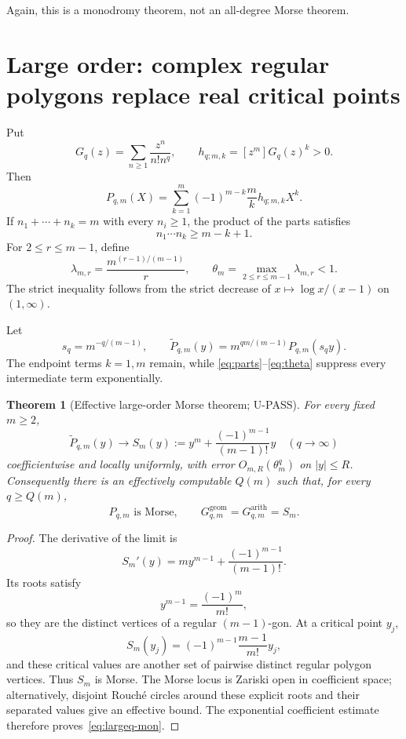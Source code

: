 \documentclass[11pt]{article}
\theoremstyle{keio}
\newtheorem{theorem}{Theorem}[section]
\theoremstyle{keioinput}
\newcommand{\UPASS}{\textcolor{passgreen}{\textsf{U-PASS}}}
\begin{document}
Again, this is a monodromy theorem, not an all-degree Morse theorem.

\section{Large order: complex regular polygons replace real critical points}

Put
\[
G_q(z)=\sum_{n\ge1}\frac{z^n}{n!n^q},
\qquad
h_{q;m,k}=[z^m]G_q(z)^k>0.
\]
Then
\begin{equation}
P_{q,m}(X)
=\sum_{k=1}^m(-1)^{m-k}\frac{m}{k}h_{q;m,k}X^k.
\label{eq:P-positive}
\end{equation}
If $n_1+\cdots+n_k=m$ with every $n_i\ge1$, the product of the parts
satisfies
\begin{equation}
n_1\cdots n_k\ge m-k+1.
\label{eq:parts}
\end{equation}
For $2\le r\le m-1$, define
\begin{equation}
\lambda_{m,r}=\frac{m^{(r-1)/(m-1)}}r,
\qquad
\theta_m=\max_{2\le r\le m-1}\lambda_{m,r}<1.
\label{eq:theta}
\end{equation}
The strict inequality follows from the strict decrease of
$x\mapsto\log x/(x-1)$ on $(1,\infty)$.

Let
\[
s_q=m^{-q/(m-1)},
\qquad
\widetilde P_{q,m}(y)
=m^{qm/(m-1)}P_{q,m}(s_qy).
\]
The endpoint terms $k=1,m$ remain, while
\eqref{eq:parts}--\eqref{eq:theta} suppress every intermediate term
exponentially.

\begin{theorem}[Effective large-order Morse theorem; \UPASS]\label{thm:largeq}
For every fixed $m\ge2$,
\begin{equation}
\boxed{
\widetilde P_{q,m}(y)
\longrightarrow
S_m(y):=y^m+\frac{(-1)^{m-1}}{(m-1)!}y
\quad(q\to\infty)}
\label{eq:limit}
\end{equation}
coefficientwise and locally uniformly, with error
$O_{m,R}(\theta_m^q)$ on $|y|\le R$. Consequently there is an effectively
computable $Q(m)$ such that, for every $q\ge Q(m)$,
\begin{equation}
\boxed{
P_{q,m}\text{ is Morse},
\qquad
G^{\mathrm{geom}}_{q,m}=G^{\mathrm{arith}}_{q,m}=S_m.}
\label{eq:largeq-mon}
\end{equation}
\end{theorem}

\begin{proof}
The derivative of the limit is
\[
S_m'(y)=my^{m-1}+\frac{(-1)^{m-1}}{(m-1)!}.
\]
Its roots satisfy
\[
y^{m-1}=\frac{(-1)^m}{m!},
\]
so they are the distinct vertices of a regular $(m-1)$-gon. At a critical
point $y_j$,
\[
S_m(y_j)=(-1)^{m-1}\frac{m-1}{m!}y_j,
\]
and these critical values are another set of pairwise distinct regular
polygon vertices. Thus $S_m$ is Morse. The Morse locus is Zariski open in
coefficient space; alternatively, disjoint Rouch\'e circles around these
explicit roots and their separated values give an effective bound. The
exponential coefficient estimate therefore proves~\eqref{eq:largeq-mon}.
\end{proof}
\end{document}
